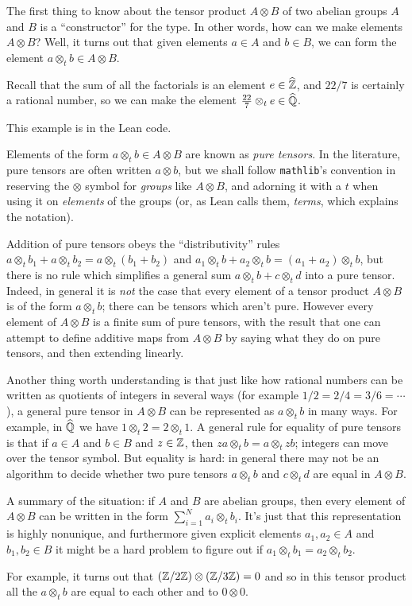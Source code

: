 The first thing to know about the tensor product $A\otimes B$ of two abelian groups $A$ and $B$
is a ``constructor'' for the type. In other words, how can we make elements $A\otimes B$?
Well, it turns out that given elements $a\in A$ and $b\in B$, we can form the element
$a\otimes_t b\in A\otimes B$.

\begin{example} Recall that the sum of all the factorials is an element $e\in\widehat{\mathbb{Z}}$, and $22/7$ is certainly
a rational number, so we can make the element $\frac{22}{7}\otimes_te\in\widehat{\mathbb{Q}}$.
\end{example}

This example is in the Lean code.

Elements of the form $a\otimes_t b\in A\otimes B$ are known as \emph{pure tensors}. In the
literature, pure tensors
are often written $a\otimes b$, but we shall follow {\tt mathlib}'s convention in reserving
the $\otimes$ symbol for \emph{groups} like $A \otimes B$, and adorning it with a $t$ when
using it on \emph{elements} of the groups (or, as Lean calls them, \emph{terms}, which explains
the notation).

Addition of pure tensors obeys the ``distributivity'' rules
$a\otimes_t b_1+a\otimes_t b_2=a\otimes_t(b_1+b_2)$ and
$a_1\otimes_t b+a_2\otimes_t b=(a_1+a_2)\otimes_t b$, but there is no rule which simplifies
a general sum $a\otimes_t b + c\otimes_t d$ into a pure tensor. Indeed, in general it is \emph{not}
the case that every element of a tensor product $A\otimes B$ is of the form $a\otimes_t b$; there can be
tensors which aren't pure. However every element of $A\otimes B$ is a finite sum of pure tensors,
with the result that one can attempt to define additive maps from $A\otimes B$ by saying what they
do on pure tensors, and then extending linearly.

Another thing worth understanding is that just like how rational numbers can be written as
quotients of integers in several ways (for example $1/2=2/4=3/6=\cdots$), a general pure tensor
in $A\otimes B$ can be represented as $a\otimes_t b$ in many ways. For example, in $\widehat{\mathbb{Q}}$
we have $1\otimes_t 2=2\otimes_t 1$. A general rule for equality of pure tensors is that if
$a\in A$ and $b\in B$ and $z\in\mathbb{Z}$, then $za\otimes_tb=a\otimes_tzb$; integers can move over the
tensor symbol. But equality is hard: in general there may not be an algorithm to decide
whether two pure tensors $a\otimes_t b$ and $c\otimes_t d$ are equal in $A\otimes B$.

\begin{remark} A summary of the situation: if $A$ and $B$ are abelian groups, then every element
    of $A\otimes B$ can be written in the form $\sum_{i=1}^Na_i\otimes_tb_i$. It's just that this
    representation is highly nonunique, and furthermore given explicit elements $a_1,a_2\in A$
    and $b_1,b_2\in B$ it might be a hard problem to figure out if
    $a_1\otimes_t b_1=a_2\otimes_t b_2$.

    For example, it turns out that $(\mathbb{Z}/2\mathbb{Z})\otimes(\mathbb{Z}/3\mathbb{Z})=0$
    and so in this tensor product all the $a\otimes_t b$ are equal to each other and to $0\otimes 0$.
\end{remark}

